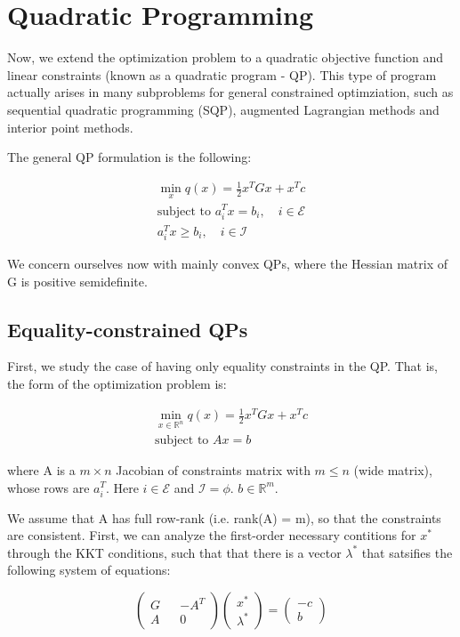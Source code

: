 \documentclass[class=article, crop=false]{standalone}
\begin{document}
\section{Quadratic Programming}
	Now, we extend the optimization problem to a quadratic objective function and linear constraints (known as a quadratic program - QP). This type of program actually arises in many subproblems for general constrained optimziation, such as sequential quadratic programming (SQP), augmented Lagrangian methods and interior point methods.

	The general QP formulation is the following:

	\begin{align}
		\min_x q(x) = \frac{1}{2} x^T G x + x^Tc \\
		\text{subject to } a_i^T x = b_i, \quad i \in \mathcal{E} \\
		a_i^T x \ge b_i, \quad i \in \mathcal{I}
	\end{align}

	We concern ourselves now with mainly convex QPs, where the Hessian matrix of G is positive semidefinite.

	\subsection{Equality-constrained QPs}
		First, we study the case of having only equality constraints in the QP. That is, the form of the optimization problem is:

		\begin{align}
			\min_{x \in \mathbb{R}^n} q(x) = \frac{1}{2} x^T G x + x^T c\\
			\text{subject to } Ax = b
		\end{align}

		where A is a $m \times n$ Jacobian of constraints matrix with $m \le n$ (wide matrix), whose rows are $a_i^T$. Here $i \in \mathcal{E}$ and $\mathcal{I} = \phi$. $b \in \mathbb{R}^m$. 

		We assume that A has full row-rank (i.e. rank(A) = m), so that the constraints are consistent. First, we can analyze the first-order necessary contitions for $x^*$ through the KKT conditions, such that that there is a vector $\lambda^*$ that satsifies the following system of equations:

		\begin{equation}
			\begin{pmatrix} G && -A^T \\ A && 0 \end{pmatrix} \begin{pmatrix} x^* \\ \lambda^* \end{pmatrix} = \begin{pmatrix} -c \\ b \end{pmatrix}
		\end{equation}
\end{document}
